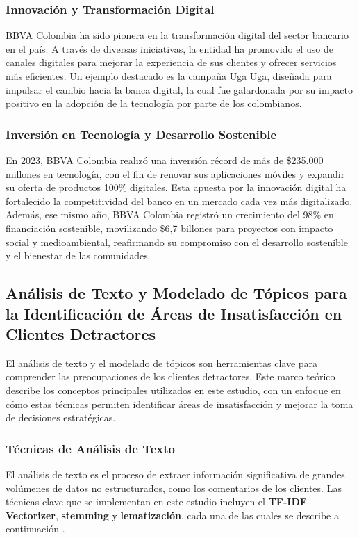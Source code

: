 \documentclass{matematicasud}
\begin{document}
\subsubsection{Innovación y Transformación Digital}
BBVA Colombia ha sido pionera en la transformación digital del sector bancario en el país. A través de diversas iniciativas, la entidad ha promovido el uso de canales digitales para mejorar la experiencia de sus clientes y ofrecer servicios más eficientes. Un ejemplo destacado es la campaña Uga Uga, diseñada para impulsar el cambio hacia la banca digital, la cual fue galardonada por su impacto positivo en la adopción de la tecnología por parte de los colombianos. \cite{3}

\subsubsection{Inversión en Tecnología y Desarrollo Sostenible}
En 2023, BBVA Colombia realizó una inversión récord de más de \$235.000 millones en tecnología, con el fin de renovar sus aplicaciones móviles y expandir su oferta de productos 100\% digitales. Esta apuesta por la innovación digital ha fortalecido la competitividad del banco en un mercado cada vez más digitalizado. Además, ese mismo año, BBVA Colombia registró un crecimiento del 98\% en financiación sostenible, movilizando \$6,7 billones para proyectos con impacto social y medioambiental, reafirmando su compromiso con el desarrollo sostenible y el bienestar de las comunidades. \cite{4}

\subsection{Análisis de Texto y Modelado de Tópicos para la Identificación de Áreas de Insatisfacción en Clientes Detractores}
El análisis de texto y el modelado de tópicos son herramientas clave para comprender las preocupaciones de los clientes detractores. Este marco teórico describe los conceptos principales utilizados en este estudio, con un enfoque en cómo estas técnicas permiten identificar áreas de insatisfacción y mejorar la toma de decisiones estratégicas.

\subsubsection{Técnicas de Análisis de Texto}

El análisis de texto es el proceso de extraer información significativa de grandes volúmenes de datos no estructurados, como los comentarios de los clientes. Las técnicas clave que se implementan en este estudio incluyen el \textbf{TF-IDF Vectorizer}, \textbf{stemming} y \textbf{lematización}, cada una de las cuales se describe a continuación \cite{8}.
\end{document}
